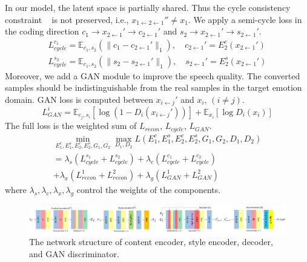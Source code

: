 \documentclass{article}
\begin{document}
In our model, the latent space is partially shared. Thus the cycle consistency constraint ~\cite{Zhu_2017_ICCV} is not preserved, i.e., $x_{1\leftarrow2\leftarrow1}'' \neq x_1$. We apply a semi-cycle loss in the coding direction $c_1 \rightarrow x_{2\leftarrow1}' \rightarrow c_{2\leftarrow1}'$ and $s_2 \rightarrow x_{2\leftarrow1}' \rightarrow s_{2\leftarrow1}'$.
\begin{equation}
\begin{aligned}
L_{cycle}^{c_1} = \mathbb{E}_{c_1, s_2} (\| c_1 - c_{2\leftarrow1}' \|_1), \quad c_{2\leftarrow1}'=E_2^c(x_{2\leftarrow1}') \\
L_{cycle}^{s_2} = \mathbb{E}_{c_1, s_2} (\| s_2 - s_{2\leftarrow1}' \|_1), \quad s_{2\leftarrow1}'=E_2^s(x_{2\leftarrow1}')
\end{aligned}
\end{equation}
Moreover, we add a GAN module to improve the speech quality. The converted samples should be indistinguishable from the real samples in the target emotion domain. GAN loss is computed between $x_{i\leftarrow j}'$ and $x_i$, $(i \neq j)$.
\begin{equation}
L_{GAN}^i = \mathbb{E}_{c_j, s_i}[\log(1-D_i(x_{i\leftarrow j}'))] + \mathbb{E}_{x_i}[\log D_i(x_i)]
\end{equation}
The full loss is the weighted sum of $L_{recon}$, $L_{cycle}$, $L_{GAN}$.
\begin{equation}
\begin{aligned}
\min_{E_1^c,E_1^s,E_2^c,E_2^s, G_1,G_2}\max_{D_1,D_2} L(E_1^c, E_1^s, E_2^c, E_2^s, G_1, G_2, D_1, D_2) \\
= \lambda_s (L_{cycle}^{s_1} + L_{cycle}^{s_2}) + \lambda_c (L_{cycle}^{c_1} + L_{cycle}^{c_2}) \ \qquad \qquad \\
+ \lambda_x (L_{recon}^1 + L_{recon}^2) + \lambda_g (L_{GAN}^1 + L_{GAN}^2) \qquad \quad
\end{aligned}
\end{equation}
where $\lambda_s, \lambda_c, \lambda_x, \lambda_g$ control the weights of the components.



\begin{figure}[t!]
\includegraphics[width=1.0\textwidth]{FIG/NN}
\caption{The network structure of content encoder, style encoder, decoder, and GAN discriminator.}
\label{fig:NN}
\end{figure}
\end{document}
